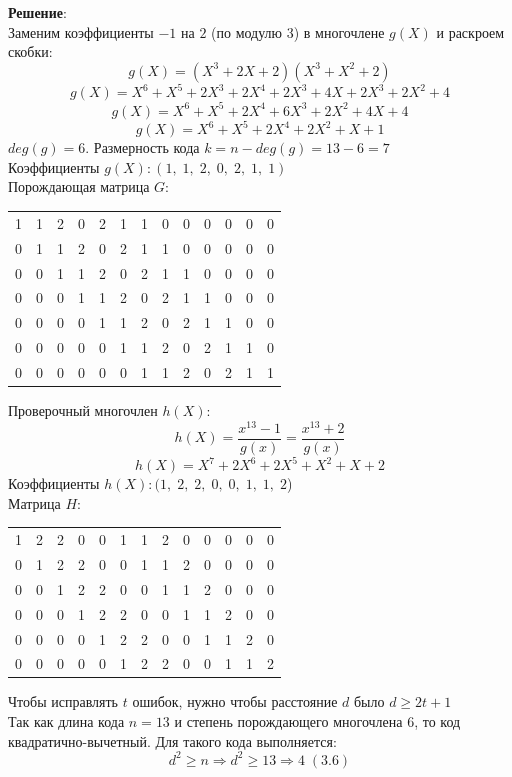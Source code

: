 \documentclass[12pt]{article}
\begin{document}
\begin{flushleft}
    \vspace{20pt}
    \textbf{Решение}: \\
    Заменим коэффициенты $-1$ на $2$ (по модулю 3) в многочлене $g(X)$ и раскроем скобки:
    \[ g(X) = (X^3 + 2X + 2)(X^3 + X^2 + 2) \]
    \[ g(X) = X^6 + X^5 + 2X^3 + 2X^4 + 2X^3 + 4X + 2X^3 + 2X^2 + 4 \]
    \[ g(X) = X^6 + X^5 + 2X^4 + 6X^3 + 2X^2 + 4X + 4 \]
    \[ g(X) = X^6 + X^5 + 2X^4 + 2X^2 + X + 1 \]
    $deg(g)=6$. Размерность кода $k = n - deg(g) = 13 - 6 = 7$ \\
    Коэффициенты $g(X): (1, \; 1, \; 2, \; 0, \; 2, \; 1, \; 1)$ \\
    Порождающая матрица $G$: \\
    \begin{table}[h!]
        \centering
        \begin{tabular}{ccccccccccccc}
            1 & 1 & 2 & 0 & 2 & 1 & 1 & 0 & 0 & 0 & 0 & 0 & 0 \\
            0 & 1 & 1 & 2 & 0 & 2 & 1 & 1 & 0 & 0 & 0 & 0 & 0 \\
            0 & 0 & 1 & 1 & 2 & 0 & 2 & 1 & 1 & 0 & 0 & 0 & 0 \\
            0 & 0 & 0 & 1 & 1 & 2 & 0 & 2 & 1 & 1 & 0 & 0 & 0 \\
            0 & 0 & 0 & 0 & 1 & 1 & 2 & 0 & 2 & 1 & 1 & 0 & 0 \\
            0 & 0 & 0 & 0 & 0 & 1 & 1 & 2 & 0 & 2 & 1 & 1 & 0 \\
            0 & 0 & 0 & 0 & 0 & 0 & 1 & 1 & 2 & 0 & 2 & 1 & 1 \\
        \end{tabular}
    \end{table}
    Проверочный многочлен $h(X)$:
    \[ h(X) = \frac{x^{13} - 1}{g(x)} = \frac{x^{13} + 2}{g(x)}\]
    \[ h(X) = X^7 + 2X^6 + 2X^5 + X^2 + X + 2 \]
    Коэффициенты $h(X): (1, \; 2, \; 2, \; 0, \; 0, \; 1, \;1, \; 2$) \\
    Матрица $H$: 
    \begin{table}[h!]
        \centering
        \begin{tabular}{ccccccccccccc}
            1 & 2 & 2 & 0 & 0 & 1 & 1 & 2 & 0 & 0 & 0 & 0 & 0 \\
            0 & 1 & 2 & 2 & 0 & 0 & 1 & 1 & 2 & 0 & 0 & 0 & 0 \\
            0 & 0 & 1 & 2 & 2 & 0 & 0 & 1 & 1 & 2 & 0 & 0 & 0 \\
            0 & 0 & 0 & 1 & 2 & 2 & 0 & 0 & 1 & 1 & 2 & 0 & 0 \\
            0 & 0 & 0 & 0 & 1 & 2 & 2 & 0 & 0 & 1 & 1 & 2 & 0 \\
            0 & 0 & 0 & 0 & 0 & 1 & 2 & 2 & 0 & 0 & 1 & 1 & 2 \\
        \end{tabular}
    \end{table}
    \newpage
    Чтобы исправлять $t$ ошибок, нужно чтобы расстояние $d$ было $d \ge 2t + 1$ \\
    Так как длина кода $n = 13$ и степень порождающего многочлена $6$, то код квадратично-вычетный. Для такого кода выполняется: 
    \[ d^2 \ge n \Rightarrow d^2 \ge 13 \Rightarrow 4 \; (3.6) \]


\end{flushleft}
\end{document}
